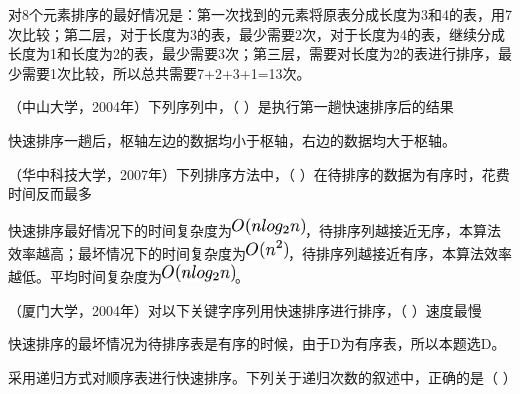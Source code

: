 \begin{solution}对8个元素排序的最好情况是：第一次找到的元素将原表分成长度为3和4的表，用7次比较；第二层，对于长度为3的表，最少需要2次，对于长度为4的表，继续分成长度为1和长度为2的表，最少需要3次；第三层，需要对长度为2的表进行排序，最少需要1次比较，所以总共需要7+2+3+1=13次。
\end{solution}
\question （中山大学，2004年）下列序列中，（ ）是执行第一趟快速排序后的结果
\par{}
\begin{solution}快速排序一趟后，枢轴左边的数据均小于枢轴，右边的数据均大于枢轴。
\end{solution}
\question （华中科技大学，2007年）下列排序方法中，（
）在待排序的数据为有序时，花费时间反而最多
\par{}
\begin{solution}快速排序最好情况下的时间复杂度为\includegraphics[width=0.76042in,height=0.18750in]{texmath/3043595Cdpi7B3507DO28nlog_2n29}，待排序列越接近无序，本算法效率越高；最坏情况下的时间复杂度为\includegraphics[width=0.43750in,height=0.19792in]{texmath/ead2f65Cdpi7B3507DO28n5E229}，待排序列越接近有序，本算法效率越低。平均时间复杂度为\includegraphics[width=0.76042in,height=0.18750in]{texmath/3043595Cdpi7B3507DO28nlog_2n29}。
\end{solution}
\question （厦门大学，2004年）对以下关键字序列用快速排序进行排序，（ ）速度最慢
\par{}
\begin{solution}快速排序的最坏情况为待排序表是有序的时候，由于D为有序表，所以本题选D。
\end{solution}
\question 采用递归方式对顺序表进行快速排序。下列关于递归次数的叙述中，正确的是（
）
\par{}
